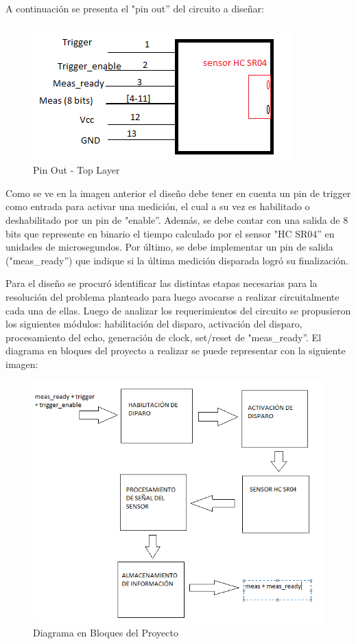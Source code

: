A continuación se presenta el "pin out'' del circuito a diseñar:

\begin{figure}[H]
\centering
\includegraphics[scale=0.6]{pinOutGenerico.PNG}
\caption{Pin Out - Top Layer}
\end{figure}

Como se ve en la imagen anterior el diseño debe tener en cuenta un
pin de trigger como entrada para activar una medición, el cual a su
vez es habilitado o deshabilitado por un pin de "enable''. Además,
se debe contar con una salida de 8 bits que represente en binario
el tiempo calculado por el sensor "HC SR04'' en unidades de microsegundos.
Por último, se debe implementar un pin de salida ("meas\_ready'')
que indique si la última medición disparada logró su finalización. 

Para el diseño se procuró identificar las distintas etapas necesarias
para la resolución del problema planteado para luego avocarse a realizar
circuitalmente cada una de ellas. Luego de analizar los requerimientos
del circuito se propusieron los siguientes módulos: habilitación del
disparo, activación del disparo, procesamiento del echo, generación
de clock, set/reset de "meas\_ready''. El diagrama en bloques del
proyecto a realizar se puede representar con la siguiente imagen:

\begin{figure}[H]
\centering
\includegraphics[scale=0.5]{diagramaDeBloquesGenerico.PNG}
\caption{Diagrama en Bloques del Proyecto}
\end{figure}

